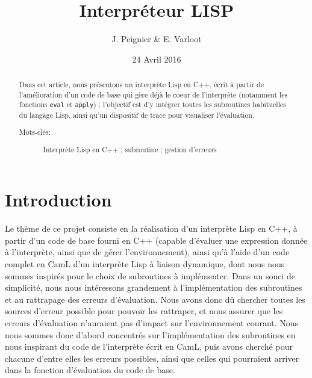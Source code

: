 \documentclass[a4paper,11pt]{article}
\title{Interpréteur LISP}
\author{J. Peignier \& E. Varloot}
\date{24 Avril 2016}
\begin{document}
\maketitle

\tableofcontents

\pagebreak


\begin{abstract}
	Dans cet article, nous présentons un interprète Lisp en C++, écrit à partir de l'amélioration d'un code de base qui gère déjà le coeur de l'interprète (notamment les fonctions \texttt{eval} et \texttt{apply}) ; l'objectif est d'y intégrer toutes les subroutines habituelles du langage Lisp, ainsi qu'un dispositif de trace pour visualiser l'évaluation.
  \begin{description}
  \item[Mots-clés:] Interprète Lisp en C++ ; subroutine ; gestion d'erreurs

  \end{description}
\end{abstract}


\section{Introduction}
	
	Le thème de ce projet consiste en la réalisation d'un interprète Lisp en C++, à partir d'un code de base fourni en C++ (capable d'évaluer une expression donnée à l'interprète, ainsi que de gérer l'environnement), ainsi qu'à l'aide d'un code complet en CamL d'un interprète Lisp à liaison dynamique, dont nous nous sommes inspirés pour le choix de subroutines à implémenter.
	Dans un souci de simplicité, nous nous intéressons grandement à l'implémentation des subroutines et au rattrapage des erreurs d'évaluation.
	Nous avons donc dû chercher toutes les sources d'erreur possible pour pouvoir les rattraper, et nous assurer que les erreurs d'évaluation n'auraient pas d'impact sur l'environnement courant.
	Nous nous sommes donc d'abord concentrés sur l'implémentation des subroutines en nous inspirant du code de l'interprète écrit en CamL, puis avons cherché pour chacune d'entre elles les erreurs possibles, ainsi que celles qui pourraient arriver dans la fonction d'évaluation du code de base.
\end{document}
